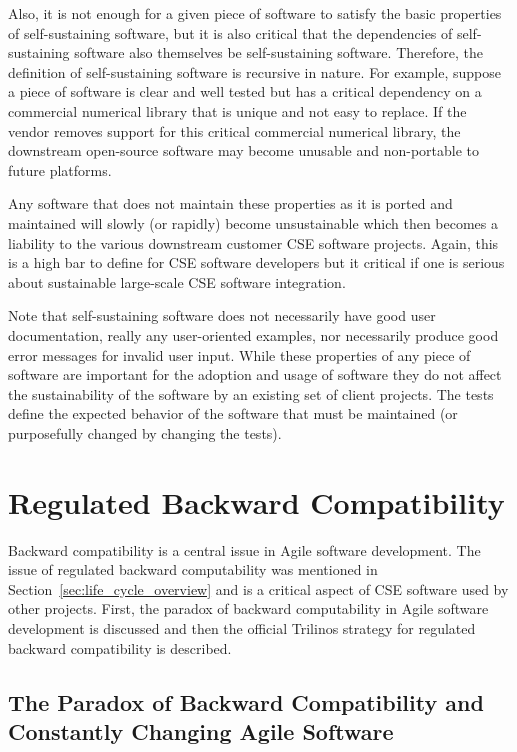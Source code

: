 \documentclass[11pt]{SANDreport}
\begin{document}
Also, it is not enough for a given piece of software to satisfy the
basic properties of self-sustaining software, but it is also critical
that the dependencies of self-sustaining software also themselves be
self-sustaining software. Therefore, the definition of self-sustaining
software is recursive in nature.  For example, suppose a piece of
software is clear and well tested but has a critical dependency on a
commercial numerical library that is unique and not easy to replace.
If the vendor removes support for this critical commercial numerical
library, the downstream open-source software may become unusable and
non-portable to future platforms.

Any software that does not maintain these properties as it is ported
and maintained will slowly (or rapidly) become unsustainable which
then becomes a liability to the various downstream customer CSE
software projects.  Again, this is a high bar to define for CSE
software developers but it critical if one is serious about
sustainable large-scale CSE software integration.

Note that self-sustaining software does not necessarily have good user
documentation, really any user-oriented examples, nor necessarily
produce good error messages for invalid user input.  While these
properties of any piece of software are important for the adoption and
usage of software they do not affect the sustainability of the software
by an existing set of client projects.  The tests define the expected
behavior of the software that must be maintained (or purposefully
changed by changing the tests).


%
{}\section{Regulated Backward Compatibility}
\label{sec:regulated_backard_compatibility}
%

Backward compatibility is a central issue in Agile software
development.  The issue of regulated backward computability was
mentioned in Section~\ref{sec:life_cycle_overview} and is a critical
aspect of CSE software used by other projects.  First, the paradox of
backward computability in Agile software development is discussed and
then the official Trilinos strategy for regulated backward
compatibility is described.


%
{}\subsection{The Paradox of Backward Compatibility and Constantly
Changing Agile Software}
\label{sec:paradox_of_back_compat_agile}
%
\end{document}
